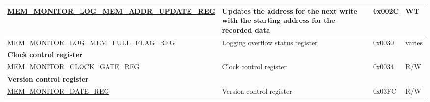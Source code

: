 \begin{longtable}{ | l | m{13cm} | l | l | }
\hyperref[regdesc:MEMMONITORLOGMEMADDRUPDATEREG]{MEM\_MONITOR\_LOG\_MEM\_ADDR\_UPDATE\_REG} & Updates the address for the next write with the starting address for the recorded data & 0x002C & WT \\ \hline
\hyperref[regdesc:MEMMONITORLOGMEMFULLFLAGREG]{MEM\_MONITOR\_LOG\_MEM\_FULL\_FLAG\_REG} & Logging overflow status register & 0x0030 & varies \\ \hline
\multicolumn{4}{|l|}{\textbf{Clock control register}} \\ \hline
\hyperref[regdesc:MEMMONITORCLOCKGATEREG]{MEM\_MONITOR\_CLOCK\_GATE\_REG} & Clock control register & 0x0034 & R/W \\ \hline
\multicolumn{4}{|l|}{\textbf{Version control register}} \\ \hline
\hyperref[regdesc:MEMMONITORDATEREG]{MEM\_MONITOR\_DATE\_REG} & Version control register & 0x03FC & R/W \\ \hline
\end{longtable}
